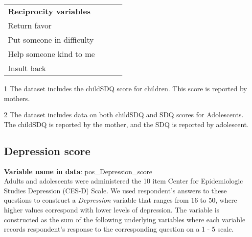 \begin{table}[H]
\begin{center}
{\begin{threeparttable}
\begin{tabular}{L{5.5cm}C{2cm} C{2cm} C{2cm}}
		\textbf{Reciprocity variables}							&									&							&								\\
		\quad \quad Return favor								&									& \checkmark				& \checkmark					 \\
		\quad \quad Put someone in difficulty					&									& \checkmark				& \checkmark					 \\	
		\quad \quad Help someone kind to me					&									& \checkmark				& \checkmark					 \\
		\quad \quad Insult back								&									& \checkmark				& \checkmark					 \\

		
		\hline
		\end{tabular}

		\begin{tablenotes}
		\singlespace
		\footnotesize{
			\item [1] The dataset includes the childSDQ score for children. This score is reported by mothers. \\
			\item [2] The dataset includes data on both childSDQ and SDQ scores for Adolescents. The childSDQ is reported by the mother, and the SDQ is reported by adolescent.	
		}
		\end{tablenotes}
	\end{threeparttable}
	}
	\end{center}
\end{table}
\setcounter{footnote}{0}

 \clearpage



\subsection{Depression score}
\textbf{Variable name in data}: pos\_Depression\_score \\[.3cm]
Adults and adolescents were administered the 10 item Center for Epidemiologic Studies Depression (CES-D) Scale. We used respondent's answers to these questions to construct a \textit{Depression} variable that ranges from 16 to 50, where higher values correspond with lower levels of depression. The variable is constructed as the sum of the following underlying variables where each variable records respondent's response to the corresponding question on a 1 - 5 scale. \\

